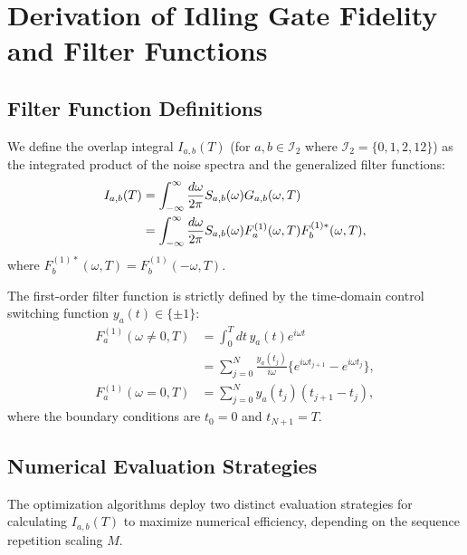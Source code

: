 \documentclass[%
 reprint,
superscriptaddress,
 amsmath,amssymb,
 aps,
pra,
]{revtex4-2}
\newcommand{\qk}[1]{{\color{OliveGreen}#1}}
\begin{document}
\section{Derivation of Idling Gate Fidelity and Filter Functions}
\label{app::deriv_fidelity}
\subsection{Filter Function Definitions}
We define the overlap integral $I_{a,b}(T)$ (for $a,b\in \mathcal{I}_2$ where $\mathcal{I}_2=\{0, 1, 2, 12\}$) as the integrated product of the noise spectra and the generalized filter functions:
\begin{align}
    I_{a,b}(T) &= \int_{-\infty}^{\infty} \frac{d\omega}{2\pi} S_{a,b}(\omega) G_{a,b}(\omega,T) \notag\\
    &= \int_{-\infty}^{\infty} \frac{d\omega}{2\pi} S_{a,b}(\omega) F_a^{(1)}(\omega,T) F_b^{(1)*}(\omega,T),
\end{align}
where $F_b^{(1)*}(\omega, T) = F_b^{(1)}(-\omega, T)$.

The first-order filter function is strictly defined by the time-domain control switching function $y_a(t) \in \{\pm 1\}$:
\begin{align}
    F_a^{(1)}(\omega\neq 0,T) &= \int_0^T dt \, y_a(t) e^{i\omega t} \nonumber \\
    &= \sum_{j=0}^{N} \frac{y_a(t_j)}{i\omega} \{ e^{i\omega t_{j+1}} - e^{i\omega t_j} \},\\
    F_a^{(1)}(\omega = 0,T) &= \sum_{j=0}^{N}y_a(t_j)(t_{j+1}-t_{j}),
\end{align}
where the boundary conditions are $t_0 = 0$ and $t_{N+1} = T$.

\subsection{Numerical Evaluation Strategies}
The optimization algorithms deploy two distinct evaluation strategies for calculating $I_{a,b}(T)$ to maximize numerical efficiency, depending on the sequence repetition scaling $M$.
\end{document}
